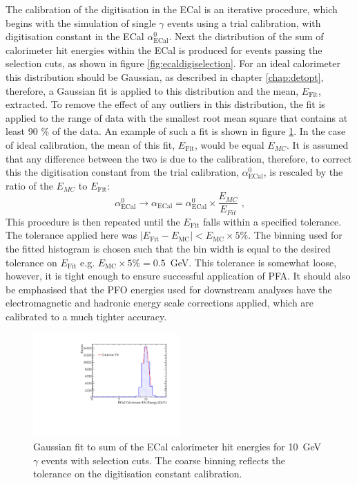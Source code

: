 The calibration of the digitisation in the ECal is an iterative procedure, which begins with the simulation of single $\gamma$ events using a trial calibration, with digitisation constant in the ECal $\alpha^{0}_{\text{ECal}}$.  Next the distribution of the sum of calorimeter hit energies within the ECal is produced for events passing the selection cuts, as shown in figure \ref{fig:ecaldigiselection}.  For an ideal calorimeter this distribution should be Gaussian, as described in chapter \ref{chap:detopt}, therefore, a Gaussian fit is applied to this distribution and the mean, $E_{\text{Fit}}$, extracted.  To remove the effect of any outliers in this distribution, the fit is applied to the range of data with the smallest root mean square that contains at least 90 \% of the data.  An example of such a fit is shown in figure \ref{fig:ecaldigifit}.  In the case of ideal calibration, the mean of this fit, $E_{\text{Fit}}$, would be equal $E_{MC}$.  It is assumed that any difference between the two is due to the calibration, therefore, to correct this the digitisation constant from the trial calibration, $\alpha^{0}_{\text{ECal}}$, is rescaled by the ratio of the $E_{MC}$ to $E_{\text{Fit}}$:
%
\begin{equation}
\alpha^{0}_{\text{ECal}} \rightarrow \alpha_{\text{ECal}} = \alpha^{0}_{\text{ECal}} \times \frac{E_{MC}}{E_{Fit}}\text{ ,}
\end{equation}
%
This procedure is then repeated until the $E_{\text{Fit}}$ falls within a specified tolerance.  The tolerance applied here was $|E_{\text{Fit}} - E_{\text{MC}}| < E_{\text{MC}} \times 5 \%$.  The binning used for the fitted histogram is chosen such that the bin width is equal to the desired tolerance on $E_{\text{Fit}}$ e.g. $E_{\text{MC}} \times 5 \% = 0.5$~GeV.  This tolerance is somewhat loose, however, it is tight enough to ensure successful application of PFA.  It should also be emphasised that the PFO energies used for downstream analyses have the electromagnetic and hadronic energy scale corrections applied, which are calibrated to a much tighter accuracy.

\begin{figure}[h!]
\includegraphics[width=0.5\textwidth]{EnergyEstimators/Plots/Calibration/Digitsation/ECal/DigitisationECalFit.pdf}
\caption[Gaussian fit to sum of the ECal calorimeter hit energies for 10~GeV $\gamma$ events with selection cuts.  The coarse binning reflects the tolerance on the digitisation constant calibration.]{Gaussian fit to sum of the ECal calorimeter hit energies for 10~GeV $\gamma$ events with selection cuts.  The coarse binning reflects the tolerance on the digitisation constant calibration.}
\label{fig:ecaldigifit}
\end{figure}

